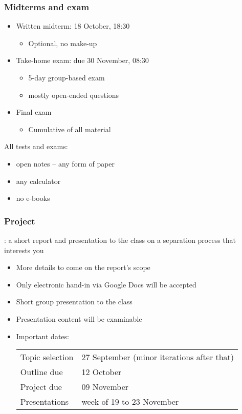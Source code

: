 \begin{frame}\frametitle{Midterms and exam}
	\begin{itemize}
		\item	Written midterm: 18 October, 18:30
		\begin{itemize}
			\item	Optional, no make-up
		\end{itemize}
		
		\item	Take-home exam: due 30 November, 08:30
		\begin{itemize}
			\item	5-day group-based exam
			\item	mostly open-ended questions
		\end{itemize}
		
		\item	Final exam
		\begin{itemize}
			\item	Cumulative of all material
		\end{itemize}		
	\end{itemize}

	\vspace{12pt}
	All tests and exams:
	\begin{itemize}
		\item	open notes -- any form of paper
		\item	any calculator
		\item	no e-books \hfill {\color{myOrange}{\scriptsize (ideas on how to handle this? Please reply via feedback form)}}
	\end{itemize}	
\end{frame}

\begin{frame}\frametitle{Project}
	\begin{exampleblock}{}
		\textbf{{\color{myBlue}{AIM}}}: a short report and presentation to the class on a separation process that interests you
	\end{exampleblock}
	\begin{itemize}
		\item	More details to come on the report's scope
		\item	Only electronic hand-in via Google Docs will be accepted
		\item	Short group presentation to the class
		\item	Presentation content will be examinable
		\item	Important dates: 
		
		\vspace{12pt}
		\begin{tabular}{ll}
			Topic selection & 27 September (minor iterations after that)\\
			Outline due & 12 October\\
			Project due & 09 November\\
			Presentations & week of 19 to 23 November\\
		\end{tabular}
	\end{itemize}
\end{frame}

